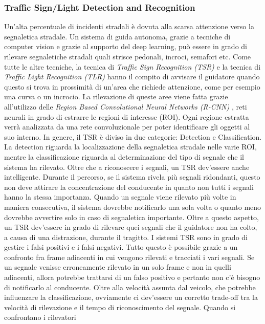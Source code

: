 \subsubsection{Traffic Sign/Light Detection and Recognition}
Un'alta percentuale di incidenti stradali è dovuta alla scarsa attenzione verso 
la segnaletica stradale. Un sistema di guida autonoma, grazie a tecniche di 
computer vision e grazie al supporto del deep learning, può essere in grado 
di rilevare segnaletiche stradali quali strisce pedonali, incroci, semafori etc. 
Come tutte le altre tecniche, la tecnica di \emph{Traffic Sign Recognition (TSR)} e 
la tecnica di \emph{Traffic Light Recognition (TLR)} hanno il compito di avvisare 
il guidatore quando questo si trova in prossimità di un'area che richiede 
attenzione, come per esempio una curva o un incrocio. La rilevazione di 
queste aree viene fatta grazie all'utilizzo delle \emph{Region Based Convolutional 
Neural Networks (R-CNN)} \cite{RCNN-TLR}, reti neurali in grado di estrarre le regioni 
di interesse (ROI). Ogni regione estratta verrà analizzata da una rete 
convoluzionale per poter identificare gli oggetti al suo interno. In genere, 
il TSR è diviso in due categorie: Detection e Classification. La detection 
riguarda la localizzazione della segnaletica stradale nelle varie ROI, mentre la 
classificazione riguarda al determinazione del tipo di segnale che il sistema 
ha rilevato. Oltre che a riconoscere i segnali, un TSR dev'essere anche 
intelligente. Durante il percorso, se il sistema rivela più segnali ridondanti, 
questo non deve attirare la concentrazione del conducente in quanto non tutti 
i segnali hanno la stessa importanza. Quando un segnale viene rilevato più 
volte in maniera consecutiva, il sistema dovrebbe notificarlo una sola volta 
o quanto meno dovrebbe avvertire solo in caso di segnaletica importante. 
Oltre a questo aspetto, un TSR dev'essere in grado di rilevare quei segnali 
che il guidatore non ha colto, a causa di una distrazione, durante il tragitto. 
I sistemi TSR sono in grado di gestire i falsi positivi e i falsi negativi. Tutto 
questo è possibile grazie a un confronto fra frame adiacenti in cui vengono 
rilevati e tracciati i vari segnali. Se un segnale venisse erroneamente rilevato 
in un solo frame e non in quelli adiacenti, allora potrebbe trattarsi di un 
falso positivo e pertanto non c'è bisogno di notificarlo al conducente. Oltre 
alla velocità assunta dal veicolo, che potrebbe influenzare la classificazione, 
ovviamente ci dev'essere un corretto trade-off tra la velocità di rilevazione e 
il tempo di riconoscimento del segnale. Quando si confrontano i rilevatori 
